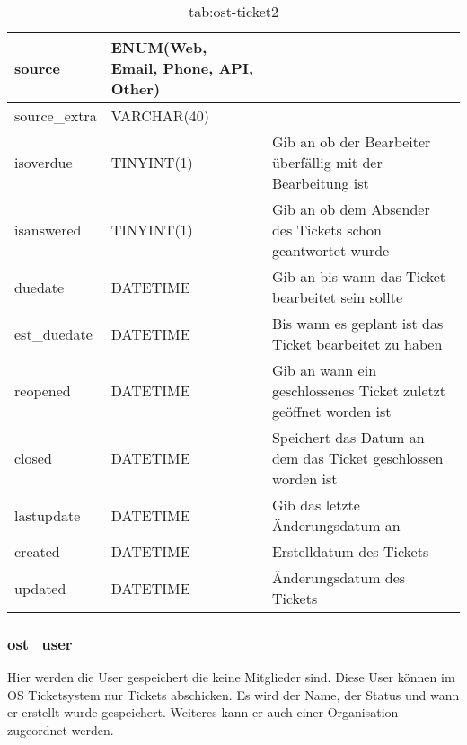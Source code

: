 		\begin{table}[h]
			\begin{tabular}{|p{3.5cm}|p{4cm}|p{6.2cm}|}
		\hline
		source & ENUM(Web, Email, Phone, API, Other) &\\
		\hline
		source\_extra & VARCHAR(40)&\\
		\hline
		isoverdue & TINYINT(1) & Gib an ob der Bearbeiter überfällig mit der Bearbeitung ist\\
		\hline
		isanswered & TINYINT(1) & Gib an ob dem Absender des Tickets schon geantwortet wurde\\
		\hline
		duedate & DATETIME & Gib an bis wann das Ticket bearbeitet sein sollte\\
		\hline
		est\_duedate & DATETIME & Bis wann es geplant ist das Ticket bearbeitet zu haben \\
		\hline
		reopened & DATETIME & Gib an wann ein geschlossenes Ticket zuletzt geöffnet worden ist \\
		\hline
		closed & DATETIME & Speichert das Datum an dem das Ticket geschlossen worden ist \\
		\hline
		lastupdate & DATETIME & Gib das letzte Änderungsdatum an \\
		\hline
		created & DATETIME & Erstelldatum des Tickets\\
		\hline
		updated & DATETIME & Änderungsdatum des Tickets\\
		\hline
	\end{tabular}
	\caption{tab:ost-ticket2}
\end{table}
\label{tab:ost_ticket2}

\newpage


\subsubsection{ost\_user}

Hier werden die User gespeichert die keine Mitglieder sind. Diese User können im OS Ticketsystem nur Tickets abschicken. Es wird der Name, der Status und wann er erstellt wurde gespeichert. Weiteres kann er auch einer Organisation zugeordnet werden.

